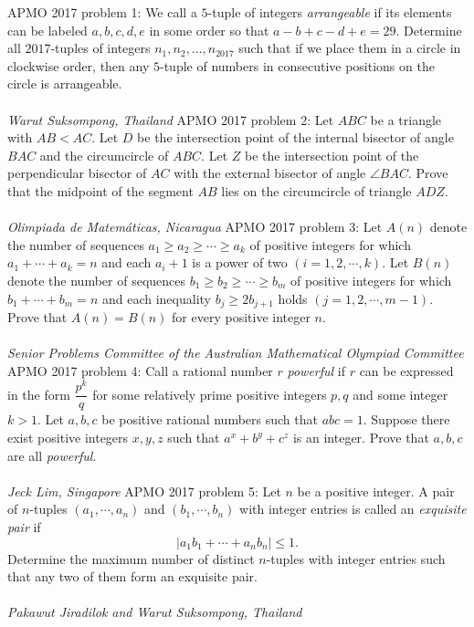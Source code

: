 APMO 2017 problem 1:  We call a $5$-tuple of integers \textit{arrangeable} if its elements can be labeled $a, b, c, d, e$ in some order so that $a-b+c-d+e=29$. Determine all $2017$-tuples of integers $n_1, n_2, . . . , n_{2017}$ such that if we place them in a circle in clockwise order, then any $5$-tuple of numbers in consecutive positions on the circle is arrangeable. \\\\
\textit{Warut Suksompong, Thailand} 
APMO 2017 problem 2:  Let $ABC$ be a triangle with $AB < AC$. Let $D$ be the intersection point of the internal bisector of angle $BAC$ and the circumcircle of $ABC$. Let $Z$ be the intersection point of the perpendicular bisector of $AC$ with the external bisector of angle $\angle{BAC}$. Prove that the midpoint of the segment $AB$ lies on the circumcircle of triangle $ADZ$. \\\\
\textit{Olimpiada de Matemáticas, Nicaragua} 
APMO 2017 problem 3:  Let $A(n)$ denote the number of sequences $a_1\ge a_2\ge\cdots{}\ge a_k$ of positive integers for which $a_1+\cdots{}+a_k = n$ and each $a_i +1$ is a power of two $(i = 1,2,\cdots{},k)$. Let $B(n)$ denote the number of sequences $b_1\ge b_2\ge \cdots{}\ge b_m$ of positive integers for which $b_1+\cdots{}+b_m =n$ and each inequality $b_j\ge 2b_{j+1}$ holds $(j=1,2,\cdots{}, m-1)$. Prove that $A(n) = B(n)$ for every positive integer $n$. \\\\
\textit{Senior Problems Committee of the Australian Mathematical Olympiad Committee} 
APMO 2017 problem 4:  Call a rational number $r$ \textit{powerful} if $r$ can be expressed in the form $\dfrac{p^k}{q}$ for some relatively prime positive integers $p, q$ and some integer $k >1$. Let $a, b, c$ be positive rational numbers such that $abc = 1$. Suppose there exist positive integers $x, y, z$ such that $a^x + b^y + c^z$ is an integer. Prove that $a, b, c$ are all \textit{powerful}. \\\\
\textit{Jeck Lim, Singapore} 
APMO 2017 problem 5:  Let $n$ be a positive integer. A pair of $n$-tuples $(a_1,\cdots{}, a_n)$ and $(b_1,\cdots{}, b_n)$ with integer entries is called an \textit{exquisite pair} if
\[ |a_1b_1+\cdots{}+a_nb_n|\le 1. \]
Determine the maximum number of distinct $n$-tuples with integer entries such that any two of them form an exquisite pair. \\\\
\textit{Pakawut Jiradilok and Warut Suksompong, Thailand} 

